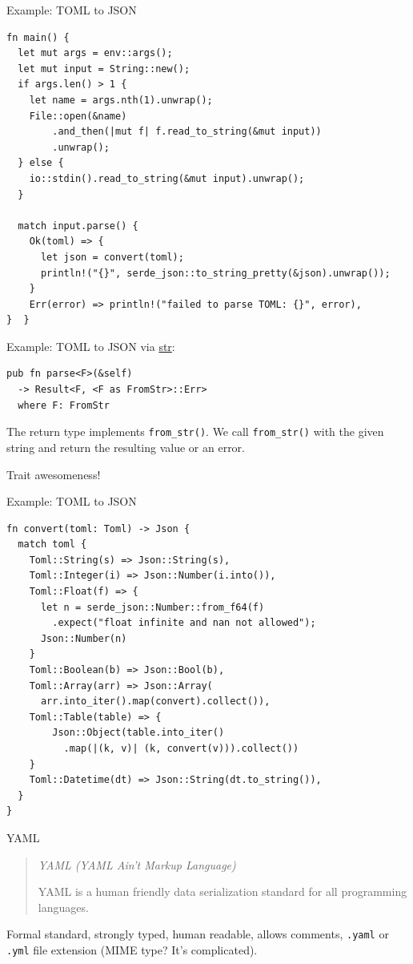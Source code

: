 \documentclass{beamer}
\begin{document}
\begin{frame}[fragile]{Example: TOML to JSON}
  \begin{verbatim}
fn main() {
  let mut args = env::args();
  let mut input = String::new();
  if args.len() > 1 {
    let name = args.nth(1).unwrap();
    File::open(&name)
        .and_then(|mut f| f.read_to_string(&mut input))
        .unwrap();
  } else {
    io::stdin().read_to_string(&mut input).unwrap();
  }

  match input.parse() {
    Ok(toml) => {
      let json = convert(toml);
      println!("{}", serde_json::to_string_pretty(&json).unwrap());
    }
    Err(error) => println!("failed to parse TOML: {}", error),
}  }
  \end{verbatim}
\end{frame}

\begin{frame}[fragile]{Example: TOML to JSON}
  via \href{https://doc.rust-lang.org/std/primitive.str.html#method.parse}{str}:
  \begin{verbatim}
pub fn parse<F>(&self)
  -> Result<F, <F as FromStr>::Err>
  where F: FromStr
  \end{verbatim}
  The return type implements \texttt{from_str()}. We call \texttt{from_str()} with the given string and return the resulting value or an error.

  Trait awesomeness!
\end{frame}

\begin{frame}[fragile]{Example: TOML to JSON}
  \begin{verbatim}
fn convert(toml: Toml) -> Json {
  match toml {
    Toml::String(s) => Json::String(s),
    Toml::Integer(i) => Json::Number(i.into()),
    Toml::Float(f) => {
      let n = serde_json::Number::from_f64(f)
        .expect("float infinite and nan not allowed");
      Json::Number(n)
    }
    Toml::Boolean(b) => Json::Bool(b),
    Toml::Array(arr) => Json::Array(
      arr.into_iter().map(convert).collect()),
    Toml::Table(table) => {
        Json::Object(table.into_iter()
          .map(|(k, v)| (k, convert(v))).collect())
    }
    Toml::Datetime(dt) => Json::String(dt.to_string()),
  }
}
  \end{verbatim}
\end{frame}

\begin{frame}[fragile]{YAML}
  \begin{quote}
    \emph{YAML (YAML Ain't Markup Language)}

    YAML is a human friendly data serialization standard for all programming languages.
  \end{quote}

  Formal standard, strongly typed, human readable, allows comments, \texttt{.yaml} or \texttt{.yml} file extension (MIME type? It's complicated).
\end{frame}
\end{document}
